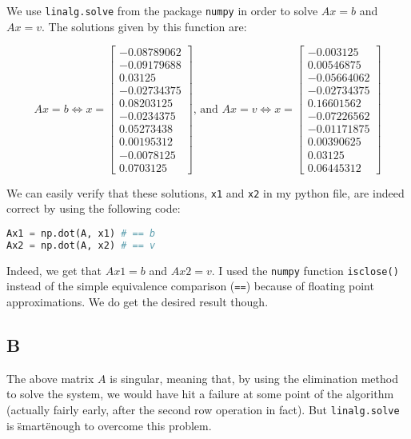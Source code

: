 \documentclass[]{article}
\begin{document}
We use \texttt{linalg.solve} from the package \texttt{numpy} in order to solve $Ax = b$ and $Ax = v$. The solutions given by this function are:

\[
Ax = b \Leftrightarrow x = \left[ \begin{array}{c}
  -0.08789062\\
  -0.09179688\\
  0.03125\\
  -0.02734375\\
  0.08203125\\
  -0.0234375\\
  0.05273438\\
  0.00195312\\
  -0.0078125\\
  0.0703125
\end{array} \right]
%
\text{, and }
%
Ax = v \Leftrightarrow x = \left[ \begin{array}{c}
  -0.003125\\
  0.00546875\\
  -0.05664062\\
  -0.02734375\\
  0.16601562\\
  -0.07226562\\
  -0.01171875\\
  0.00390625\\
  0.03125\\
  0.06445312
\end{array} \right]
\]

We can easily verify that these solutions, \texttt{x1} and \texttt{x2} in my python file, are indeed correct by using the following code:

\begin{lstlisting}[language=Python]
Ax1 = np.dot(A, x1) # == b
Ax2 = np.dot(A, x2) # == v
\end{lstlisting}

Indeed, we get that $Ax1 = b$ and $Ax2 = v$. I used the \texttt{numpy} function \texttt{isclose()} instead of the simple equivalence comparison (\texttt{==}) because of floating point approximations. We do get the desired result though.

\subsection*{B}
The above matrix $A$ is singular, meaning that, by using the elimination method to solve the system, we would have hit a failure at some point of the algorithm (actually fairly early, after the second row operation in fact). But \texttt{linalg.solve} is \"smart\" enough to overcome this problem.
\end{document}
